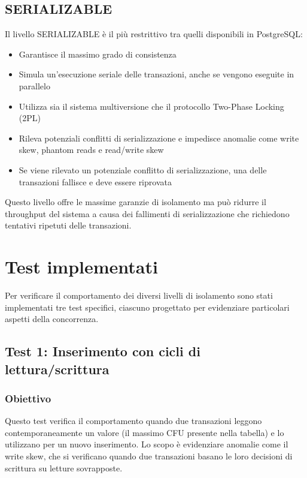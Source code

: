\documentclass[a4paper,12pt]{report}
\begin{document}
\section{SERIALIZABLE}
Il livello SERIALIZABLE è il più restrittivo tra quelli disponibili in PostgreSQL:

\begin{itemize}
    \item Garantisce il massimo grado di consistenza
    \item Simula un'esecuzione seriale delle transazioni, anche se vengono eseguite in parallelo
    \item Utilizza sia il sistema multiversione che il protocollo Two-Phase Locking (2PL)
    \item Rileva potenziali conflitti di serializzazione e impedisce anomalie come write skew, phantom reads e read/write skew
    \item Se viene rilevato un potenziale conflitto di serializzazione, una delle transazioni fallisce e deve essere riprovata
\end{itemize}

Questo livello offre le massime garanzie di isolamento ma può ridurre il throughput del sistema a causa dei fallimenti di serializzazione che richiedono tentativi ripetuti delle transazioni.

\chapter{Test implementati}
Per verificare il comportamento dei diversi livelli di isolamento sono stati implementati tre test specifici, ciascuno progettato per evidenziare particolari aspetti della concorrenza.

\section{Test 1: Inserimento con cicli di lettura/scrittura}
\subsection{Obiettivo}
Questo test verifica il comportamento quando due transazioni leggono contemporaneamente un valore (il massimo CFU presente nella tabella) e lo utilizzano per un nuovo inserimento. Lo scopo è evidenziare anomalie come il write skew, che si verificano quando due transazioni basano le loro decisioni di scrittura su letture sovrapposte.
\end{document}
